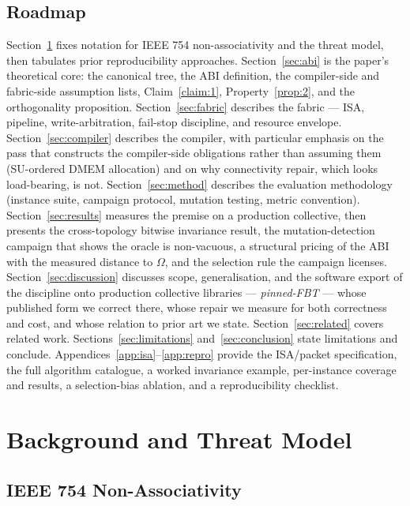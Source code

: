 \documentclass[journal,10pt]{IEEEtran}
\theoremstyle{plain}
\theoremstyle{definition}
\theoremstyle{remark}
\begin{document}
\subsection{Roadmap}

Section~\ref{sec:background} fixes notation for IEEE 754 non-associativity
and the threat model, then tabulates prior reproducibility approaches.
Section~\ref{sec:abi} is the paper's theoretical core: the canonical tree,
the ABI definition, the compiler-side and fabric-side assumption lists,
Claim~\ref{claim:1}, Property~\ref{prop:2}, and the orthogonality proposition.
Section~\ref{sec:fabric} describes the fabric --- ISA, pipeline,
write-arbitration, fail-stop discipline, and resource envelope.
Section~\ref{sec:compiler} describes the compiler, with particular
emphasis on the pass that constructs the compiler-side obligations rather
than assuming them (SU-ordered DMEM allocation) and on why connectivity
repair, which looks load-bearing, is not. Section~\ref{sec:method} describes the evaluation methodology
(instance suite, campaign protocol, mutation testing, metric convention).
Section~\ref{sec:results} measures the premise on a production collective,
then presents the cross-topology bitwise invariance
result, the mutation-detection campaign that shows the oracle is
non-vacuous, a structural pricing of the ABI with the measured distance to
$\Omega$, and the selection rule the campaign licenses. Section~\ref{sec:discussion}
discusses scope, generalisation, and the software export of the
discipline onto production collective libraries --- \emph{pinned-FBT} ---
whose published form we correct there, whose repair we measure for both
correctness and cost, and whose relation to prior art we state. Section~\ref{sec:related} covers related work.
Sections~\ref{sec:limitations} and~\ref{sec:conclusion} state limitations
and conclude. Appendices~\ref{app:isa}--\ref{app:repro} provide the
ISA/packet specification, the full algorithm catalogue, a worked
invariance example, per-instance coverage and results, a selection-bias
ablation, and a reproducibility checklist.


\section{Background and Threat Model}\label{sec:background}

\subsection{IEEE 754 Non-Associativity}
\end{document}
